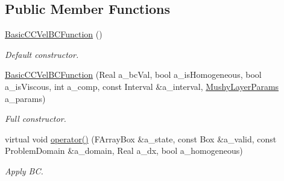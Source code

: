 \subsection*{Public Member Functions}
\begin{DoxyCompactItemize}
\item 
\hypertarget{class_basic_c_c_vel_b_c_function_a2aefce6b0178a7685f7e9a8870e06469}{\hyperlink{class_basic_c_c_vel_b_c_function_a2aefce6b0178a7685f7e9a8870e06469}{Basic\-C\-C\-Vel\-B\-C\-Function} ()}\label{class_basic_c_c_vel_b_c_function_a2aefce6b0178a7685f7e9a8870e06469}

\begin{DoxyCompactList}\small\item\em Default constructor. \end{DoxyCompactList}\item 
\hypertarget{class_basic_c_c_vel_b_c_function_af0169553178a9d0147b4b486b0d72984}{\hyperlink{class_basic_c_c_vel_b_c_function_af0169553178a9d0147b4b486b0d72984}{Basic\-C\-C\-Vel\-B\-C\-Function} (Real a\-\_\-bc\-Val, bool a\-\_\-is\-Homogeneous, bool a\-\_\-is\-Viscous, int a\-\_\-comp, const Interval \&a\-\_\-interval, \hyperlink{class_mushy_layer_params}{Mushy\-Layer\-Params} a\-\_\-params)}\label{class_basic_c_c_vel_b_c_function_af0169553178a9d0147b4b486b0d72984}

\begin{DoxyCompactList}\small\item\em Full constructor. \end{DoxyCompactList}\item 
\hypertarget{class_basic_c_c_vel_b_c_function_aaa772ec6372e133171a66d8d778a3cb7}{virtual void \hyperlink{class_basic_c_c_vel_b_c_function_aaa772ec6372e133171a66d8d778a3cb7}{operator()} (F\-Array\-Box \&a\-\_\-state, const Box \&a\-\_\-valid, const Problem\-Domain \&a\-\_\-domain, Real a\-\_\-dx, bool a\-\_\-homogeneous)}\label{class_basic_c_c_vel_b_c_function_aaa772ec6372e133171a66d8d778a3cb7}

\begin{DoxyCompactList}\small\item\em Apply B\-C. \end{DoxyCompactList}\end{DoxyCompactItemize}
